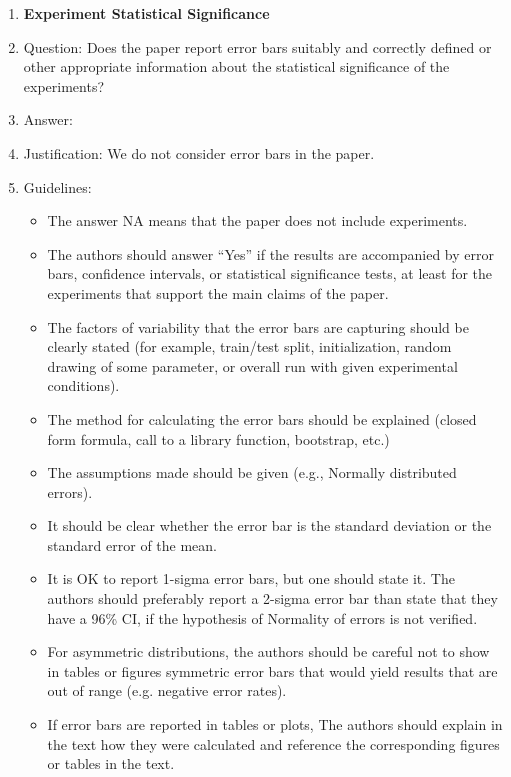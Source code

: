 \documentclass{article} %
\newcounter{ct}
\theoremstyle{definition}
\theoremstyle{remark}
\begin{document}
\begin{enumerate}
\item {\bf Experiment Statistical Significance}
    \item[] Question: Does the paper report error bars suitably and correctly defined or other appropriate information about the statistical significance of the experiments?
    \item[] Answer: \answerNA{} %
    \item[] Justification: We do not consider error bars in the paper.
    \item[] Guidelines:
    \begin{itemize}
        \item The answer NA means that the paper does not include experiments.
        \item The authors should answer ``Yes'' if the results are accompanied by error bars, confidence intervals, or statistical significance tests, at least for the experiments that support the main claims of the paper.
        \item The factors of variability that the error bars are capturing should be clearly stated (for example, train/test split, initialization, random drawing of some parameter, or overall run with given experimental conditions).
        \item The method for calculating the error bars should be explained (closed form formula, call to a library function, bootstrap, etc.)
        \item The assumptions made should be given (e.g., Normally distributed errors).
        \item It should be clear whether the error bar is the standard deviation or the standard error of the mean.
        \item It is OK to report 1-sigma error bars, but one should state it. The authors should preferably report a 2-sigma error bar than state that they have a 96\% CI, if the hypothesis of Normality of errors is not verified.
        \item For asymmetric distributions, the authors should be careful not to show in tables or figures symmetric error bars that would yield results that are out of range (e.g. negative error rates).
        \item If error bars are reported in tables or plots, The authors should explain in the text how they were calculated and reference the corresponding figures or tables in the text.
    \end{itemize}


\end{enumerate}
\end{document}

